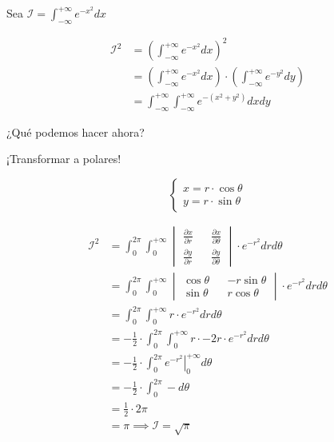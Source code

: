 \begin{frame}[fragile]
    \begin{center}
    Sea $\mathcal{I} = \int_{- \infty}^{+ \infty}{e^{-x^2}dx}$
    \end{center}
    \begin{align*}
        \mathcal{I}^2 &= \left ( \int_{- \infty}^{+ \infty}{e^{-x^2}dx} \right )^2 \\
        &= \left ( \int_{- \infty}^{+ \infty}{e^{-x^2}dx} \right ) \cdot \left ( \int_{- \infty}^{+ \infty}{e^{-y^2}dy} \right ) \\
        &= \int_{- \infty}^{+ \infty} \int_{-\infty}^{+\infty}{e^{-(x^2 + y^2)}dxdy}
    \end{align*}
    \begin{center}
    ¿Qué podemos hacer ahora?
    \end{center}

    \begin{center}
    ¡Transformar a polares!
    \end{center}
    $$
    \begin{cases}
        x = r \cdot \cos{\theta} \\
        y = r \cdot \sin{\theta}
    \end{cases}
    $$
\end{frame}

\begin{frame}[fragile]
    \begin{align*}
        \mathcal{I}^2 &= \int_{0}^{2 \pi}\int_0^{+ \infty} \begin{vmatrix} \frac{\partial x}{\partial r} && \frac{\partial x}{\partial \theta} \\ \frac{\partial y}{\partial r} && \frac{\partial y}{\partial \theta}\end{vmatrix} \cdot e^{-r^2} dr d\theta \\
        &= \int_{0}^{2 \pi}\int_0^{+ \infty} \begin{vmatrix} \cos \theta && -r \sin \theta \\ \sin \theta && r \cos \theta \end{vmatrix} \cdot e^{-r^2} dr d\theta \\
        &= \int_{0}^{2 \pi}\int_0^{+ \infty} r \cdot e^{-r^2} dr d\theta \\
        &= -\frac{1}{2} \cdot \int_{0}^{2 \pi}\int_0^{+ \infty} r \cdot -2r \cdot e^{-r^2} dr d\theta \\
        &= -\frac{1}{2} \cdot \int_{0}^{2 \pi} \left . e^{-r^2} \right |_{0}^{+ \infty} d\theta\\
        &= -\frac{1}{2} \cdot \int_{0}^{2 \pi} - d\theta \\
        &= \frac{1}{2} \cdot 2\pi \\
        &= \pi \implies \boxed{\mathcal{I} = \sqrt{\pi}}
    \end{align*}
\end{frame}

